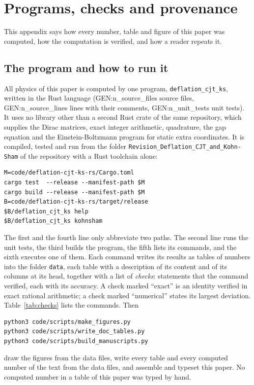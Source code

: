 \section{Programs, checks and provenance}
\label{app:checks}

This appendix says how every number, table and figure of this paper was computed, how the
computation is verified, and how a reader repeats it.

\subsection{The program and how to run it}

All physics of this paper is computed by one program, \texttt{deflation\_cjt\_ks}, written in the
Rust language ({{GEN:n_source_files}} source files, {{GEN:n_source_lines}} lines with their
comments, {{GEN:n_unit_tests}} unit tests). It uses no library other than a second Rust crate of the
same repository, which supplies the Dirac matrices, exact integer arithmetic, quadrature, the gap
equation and the Einstein-Boltzmann program for static extra coordinates. It is compiled, tested and
run from the folder \texttt{Revision\_Deflation\_CJT\_and\_Kohn-Sham} of the repository
\cite{DeflationRepo} with a Rust toolchain alone:
{\footnotesize
\begin{verbatim}
M=code/deflation-cjt-ks-rs/Cargo.toml
cargo test  --release --manifest-path $M
cargo build --release --manifest-path $M
B=code/deflation-cjt-ks-rs/target/release
$B/deflation_cjt_ks help
$B/deflation_cjt_ks kohnsham
\end{verbatim}
}
\noindent The first and the fourth line only abbreviate two paths. The second line runs the unit
tests, the third builds the program, the fifth lists its commands, and the sixth executes one of
them. Each command writes its results as tables of numbers into the
folder \texttt{data}, each table with a description of its content and of its columns at its head,
together with a list of \emph{checks}: statements that the command verified, each with its
accuracy. A check marked ``exact'' is an identity verified in exact rational arithmetic; a check
marked ``numerical'' states its largest deviation. Table~\ref{tab:checks} lists the commands. Then
{\footnotesize
\begin{verbatim}
python3 code/scripts/make_figures.py
python3 code/scripts/write_doc_tables.py
python3 code/scripts/build_manuscripts.py
\end{verbatim}
}
\noindent draw the figures from the data files, write every table and every computed number of the text from
the data files, and assemble and typeset this paper. No computed number in a table of this paper was
typed by hand.

